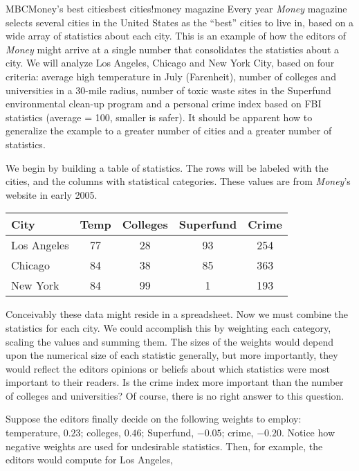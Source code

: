\begin{example}{MBC}{Money's best cities}{best cities!money magazine}
Every year {\sl Money} magazine selects several cities in the United States as the ``best'' cities to live in, based on a wide array of statistics about each city.  This is an example of how the editors of {\sl Money} might arrive at a single number that consolidates the statistics about a city.  We will analyze Los Angeles, Chicago and New York City, based on four criteria:  average high temperature in July (Farenheit), number of colleges and universities in a 30-mile radius, number of toxic waste sites in the Superfund environmental clean-up program and a personal crime index based on FBI statistics (average = 100, smaller is safer).  It should be apparent how to generalize the example to a greater number of cities and a greater number of statistics.\par
%
We begin by building a table of statistics.  The rows will be labeled with the cities, and the columns with statistical categories.  These values are from {\sl Money}'s website in early 2005.\par
%
\begin{center}
\begin{tabular}{||l||c|c|c|c||}\hline
City & Temp & Colleges & Superfund & Crime\\\hline\hline
Los Angeles & 77 & 28 & 93 & 254\\\hline
Chicago & 84 & 38 & 85 & 363\\\hline
New York & 84 & 99 & 1 & 193\\\hline\hline
\end{tabular}
\end{center}
%
Conceivably these data might reside in a spreadsheet.  Now we must combine the statistics for each city.  We could accomplish this by weighting each category, scaling the values and summing them.  The sizes of the weights would depend upon the numerical size of each statistic generally, but more importantly, they would reflect the editors opinions or beliefs about which statistics were most important to their readers.  Is the crime index more important than the number of colleges and universities?  Of course, there is no right answer to this question.\par
%
Suppose the editors finally decide on the following weights to employ:  temperature, $0.23$; colleges, $0.46$; Superfund, $-0.05$; crime, $-0.20$.  Notice how negative weights are used for undesirable statistics.  Then, for example, the editors would compute for Los Angeles,

\end{example}
